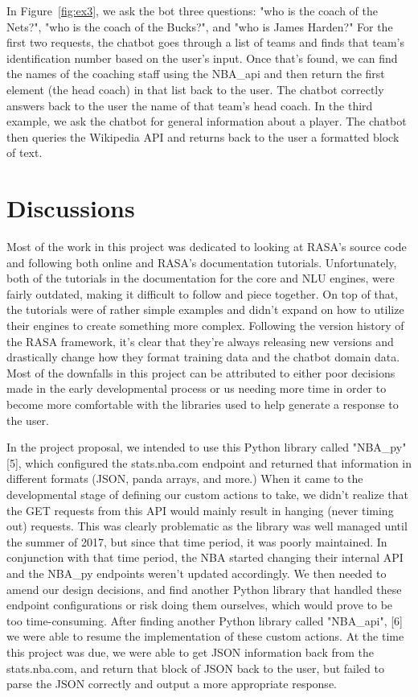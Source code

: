 \documentclass[conference]{IEEEtran}
\begin{document}
In Figure~\ref{fig:ex3}, we ask the bot three questions: "who is the coach of the Nets?", "who is the coach of the Bucks?", and "who is James Harden?" For the first two requests, the chatbot goes through a list of teams and finds that team's identification number based on the user's input. Once that's found, we can find the names of the coaching staff using the NBA\_api and then return the first element (the head coach) in that list back to the user. The chatbot correctly answers back to the user the name of that team's head coach. In the third example, we ask the chatbot for general information about a player. The chatbot then queries the Wikipedia API and returns back to the user a formatted block of text.

\section*{Discussions}
Most of the work in this project was dedicated to looking at RASA's source code and following both online and RASA's documentation tutorials. Unfortunately, both of the tutorials in the documentation for the core and NLU engines, were fairly outdated, making it difficult to follow and piece together. On top of that, the tutorials were of rather simple examples and didn't expand on how to utilize their engines to create something more complex. Following the version history of the RASA framework, it's clear that they're always releasing new versions and drastically change how they format training data and the chatbot domain data. Most of the downfalls in this project can be attributed to either poor decisions made in the early developmental process or us needing more time in order to become more comfortable with the libraries used to help generate a response to the user.

In the project proposal, we intended to use this Python library called "NBA\_py" [5], which configured the stats.nba.com endpoint and returned that information in different formats (JSON, panda arrays, and more.) When it came to the developmental stage of defining our custom actions to take, we didn't realize that the GET requests from this API would mainly result in hanging (never timing out) requests. This was clearly problematic as the library was well managed until the summer of 2017, but since that time period, it was poorly maintained. In conjunction with that time period, the NBA started changing their internal API and the NBA\_py endpoints weren't updated accordingly. We then needed to amend our design decisions, and find another Python library that handled these endpoint configurations or risk doing them ourselves, which would prove to be too time-consuming. After finding another Python library called "NBA\_api", [6] we were able to resume the implementation of these custom actions. At the time this project was due, we were able to get JSON information back from the stats.nba.com, and return that block of JSON back to the user, but failed to parse the JSON correctly and output a more appropriate response.
\end{document}
